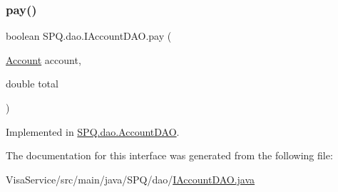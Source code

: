 \subsubsection{\texorpdfstring{pay()}{pay()}}
{\footnotesize\ttfamily boolean S\+P\+Q.\+dao.\+I\+Account\+D\+A\+O.\+pay (\begin{DoxyParamCaption}\item[{\mbox{\hyperlink{class_s_p_q_1_1data_1_1_account}{Account}}}]{account,  }\item[{double}]{total }\end{DoxyParamCaption})}



Implemented in \mbox{\hyperlink{class_s_p_q_1_1dao_1_1_account_d_a_o_ad40cd6129f180d4cb235c00756b53930}{S\+P\+Q.\+dao.\+Account\+D\+AO}}.



The documentation for this interface was generated from the following file\+:\begin{DoxyCompactItemize}
\item 
Visa\+Service/src/main/java/\+S\+P\+Q/dao/\mbox{\hyperlink{_i_account_d_a_o_8java}{I\+Account\+D\+A\+O.\+java}}\end{DoxyCompactItemize}
